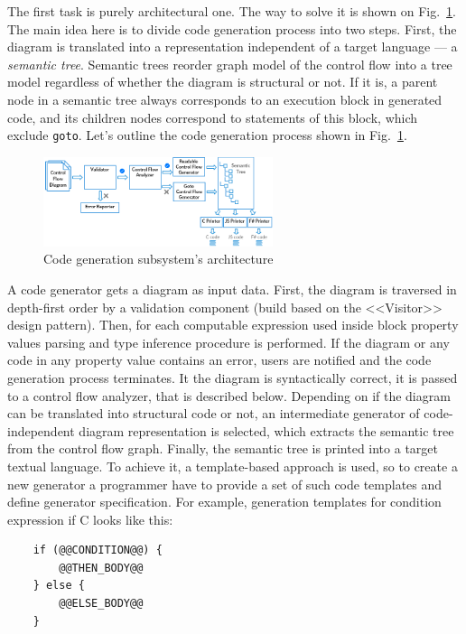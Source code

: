 \documentclass[conference]{IEEEtran}
\begin{document}
{The first task is purely architectural one. The way to solve it is shown on Fig.~\ref{image:generatorsArchitecture}. The main idea here is to divide code generation process into two steps. First, the diagram is translated into a representation independent of a target language --- a \textit{semantic tree}. Semantic trees reorder graph model of the control flow into a tree model regardless of whether the diagram is structural or not. If it is, a parent node in a semantic tree always corresponds to an execution block in generated code, and its children nodes correspond to statements of this block, which exclude \texttt{goto}. Let's outline the code generation process shown in Fig.~\ref{image:generatorsArchitecture}.

\begin{figure}[ht]
    \centering
    \includegraphics[width=0.6\textwidth]{TS_Generators_Architecture.png}
    \caption{Code generation subsystem's architecture}
    \label{image:generatorsArchitecture}
\end{figure}

A code generator gets a diagram as input data. First, the diagram is traversed in depth-first order by a validation component (build based on the <<Visitor>> design pattern). Then, for each computable expression used inside block property values parsing and type inference procedure is performed. If the diagram or any code in any property value contains an error, users are notified and the code generation process terminates. It the diagram is syntactically correct, it is passed to a control flow analyzer, that is described below. Depending on if the diagram can be translated into structural code or not, an intermediate generator of code-independent diagram representation is selected, which extracts the semantic tree from the control flow graph. Finally, the semantic tree is printed into a target textual language. To achieve it, a template-based approach is used, so to create a new generator a programmer have to provide a set of such code templates and define generator specification. For example, generation templates for condition expression if C looks like this:
\begin{verbatim}
    if (@@CONDITION@@) {
        @@THEN_BODY@@
    } else {
        @@ELSE_BODY@@
    }
\end{verbatim}

}
\end{document}
